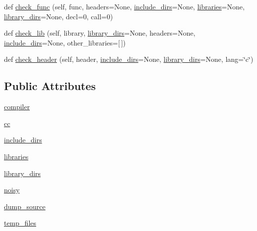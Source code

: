 \begin{DoxyCompactItemize}
\item 
def \hyperlink{classsetuptools_1_1__distutils_1_1command_1_1config_1_1config_a9273e7516a033574016cf15047afa760}{check\+\_\+func} (self, func, headers=None, \hyperlink{classsetuptools_1_1__distutils_1_1command_1_1config_1_1config_acb41ac5815aee2bd72a28028096a0564}{include\+\_\+dirs}=None, \hyperlink{classsetuptools_1_1__distutils_1_1command_1_1config_1_1config_afa0c43069889b76e5d064528fdfe4e91}{libraries}=None, \hyperlink{classsetuptools_1_1__distutils_1_1command_1_1config_1_1config_a6d195b03e0f87fbdcf6666f874f4f5e1}{library\+\_\+dirs}=None, decl=0, call=0)
\item 
def \hyperlink{classsetuptools_1_1__distutils_1_1command_1_1config_1_1config_a04079e4c25cc45d018c03a743a2071a5}{check\+\_\+lib} (self, library, \hyperlink{classsetuptools_1_1__distutils_1_1command_1_1config_1_1config_a6d195b03e0f87fbdcf6666f874f4f5e1}{library\+\_\+dirs}=None, headers=None, \hyperlink{classsetuptools_1_1__distutils_1_1command_1_1config_1_1config_acb41ac5815aee2bd72a28028096a0564}{include\+\_\+dirs}=None, other\+\_\+libraries=\mbox{[}$\,$\mbox{]})
\item 
def \hyperlink{classsetuptools_1_1__distutils_1_1command_1_1config_1_1config_a926e7aea69e0490a3fd5ccab3b432416}{check\+\_\+header} (self, header, \hyperlink{classsetuptools_1_1__distutils_1_1command_1_1config_1_1config_acb41ac5815aee2bd72a28028096a0564}{include\+\_\+dirs}=None, \hyperlink{classsetuptools_1_1__distutils_1_1command_1_1config_1_1config_a6d195b03e0f87fbdcf6666f874f4f5e1}{library\+\_\+dirs}=None, lang=\char`\"{}c\char`\"{})
\end{DoxyCompactItemize}
\subsection*{Public Attributes}
\begin{DoxyCompactItemize}
\item 
\hyperlink{classsetuptools_1_1__distutils_1_1command_1_1config_1_1config_a7c086d272846172ebd5614370507f432}{compiler}
\item 
\hyperlink{classsetuptools_1_1__distutils_1_1command_1_1config_1_1config_a58574246a0bad1440399a0e0008f6c10}{cc}
\item 
\hyperlink{classsetuptools_1_1__distutils_1_1command_1_1config_1_1config_acb41ac5815aee2bd72a28028096a0564}{include\+\_\+dirs}
\item 
\hyperlink{classsetuptools_1_1__distutils_1_1command_1_1config_1_1config_afa0c43069889b76e5d064528fdfe4e91}{libraries}
\item 
\hyperlink{classsetuptools_1_1__distutils_1_1command_1_1config_1_1config_a6d195b03e0f87fbdcf6666f874f4f5e1}{library\+\_\+dirs}
\item 
\hyperlink{classsetuptools_1_1__distutils_1_1command_1_1config_1_1config_a1e16189e15f92b6e7dad1c478a7f2fc3}{noisy}
\item 
\hyperlink{classsetuptools_1_1__distutils_1_1command_1_1config_1_1config_ada308b1fe339423e34ee62e59263584e}{dump\+\_\+source}
\item 
\hyperlink{classsetuptools_1_1__distutils_1_1command_1_1config_1_1config_a3c8d2af1bb0fff8d221ed6f08cfebe17}{temp\+\_\+files}
\end{DoxyCompactItemize}
